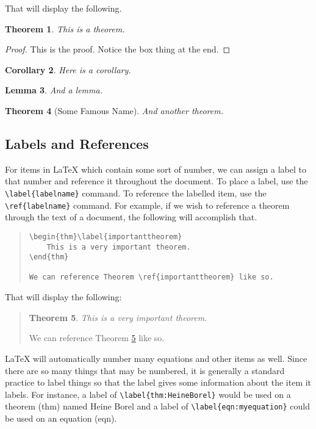 \documentclass[letterpaper,twoside,10pt]{article}
\newtheorem{thm}{Theorem}[section]
\newtheorem{cor}[thm]{Corollary}
\newtheorem{lem}[thm]{Lemma}
\begin{document}
That will display the following.

\begin{thm}
 This is a theorem.
\end{thm}

\begin{proof}
 This is the proof. Notice the box thing at the end.
\end{proof}

\begin{cor}
 Here is a corollary.
\end{cor}

\begin{lem}
 And a lemma.
\end{lem}

\begin{thm}[Some Famous Name]
 And another theorem.
\end{thm}

\newpage
\subsection{Labels and References}

For items in {\LaTeX} which contain some sort of number, we can assign a label to that number and reference it throughout the document. To place a label, use the \verb!\label{labelname}! command. To reference the labelled item, use the \verb!\ref{labelname}! command. For example, if we wish to reference a theorem through the text of a document, the following will accomplish that.

\begin{quote}
 \begin{verbatim}
\begin{thm}\label{importanttheorem}
	This is a very important theorem.
\end{thm}

We can reference Theorem \ref{importanttheorem} like so.
 \end{verbatim}
\end{quote}


That will display the following:

\begin{quote}
\begin{thm}\label{importanttheorem}
 This is a very important theorem.
\end{thm}

We can reference Theorem \ref{importanttheorem} like so.
\end{quote}

{\LaTeX} will automatically number many equations and other items as well. Since there are so many things that may be numbered, it is generally a standard practice to label things so that the label gives some information about the item it labels. For instance, a label of \verb!\label{thm:HeineBorel}! would be used on a theorem (thm) named Heine Borel and a label of \verb!\label{eqn:myequation}! could be used on an equation (eqn). 
\end{document}
